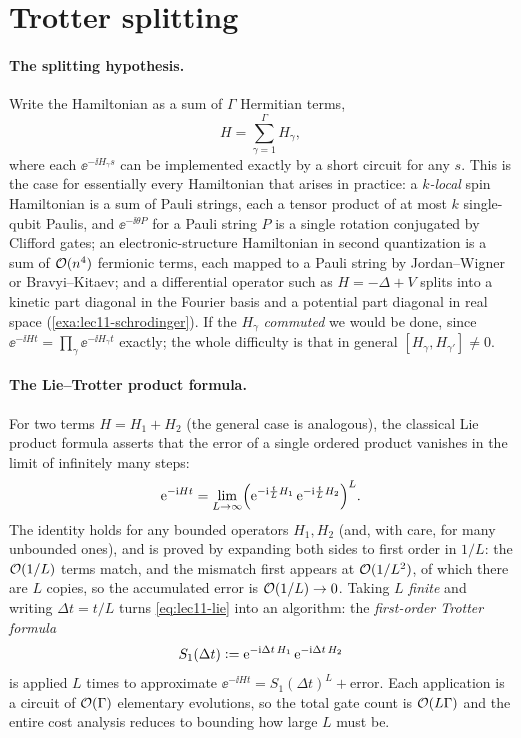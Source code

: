\section{Trotter splitting}
\label{sec:lec11-1}

\paragraph{The splitting hypothesis.}
Write the Hamiltonian as a sum of $\Gamma$ Hermitian terms,
\begin{equation}
  H=\sum_{\gamma=1}^{\Gamma}H_\gamma,
  \label{eq:lec11-split}
\end{equation}
where each $\ee^{-\ii H_\gamma s}$ can be implemented exactly by a short circuit for any
$s$. This is the case for essentially every Hamiltonian that arises in practice: a
\emph{$k$-local} spin Hamiltonian is a sum of Pauli strings, each a tensor product of at
most $k$ single-qubit Paulis, and $\ee^{-\ii\theta P}$ for a Pauli string $P$ is a single
rotation conjugated by Clifford gates; an electronic-structure Hamiltonian in second
quantization is a sum of $\mathcal{O}(n^4)$ fermionic terms, each mapped to a Pauli string by
Jordan--Wigner or Bravyi--Kitaev; and a differential operator such as
$H=-\Delta+V$ splits into a kinetic part diagonal in the Fourier basis and a potential
part diagonal in real space (\cref{exa:lec11-schrodinger}). If the $H_\gamma$
\emph{commuted} we would be done, since $\ee^{-\ii Ht}=\prod_\gamma\ee^{-\ii H_\gamma t}$
exactly; the whole difficulty is that in general $[H_\gamma,H_{\gamma'}]\neq0$.

\paragraph{The Lie--Trotter product formula.}
For two terms $H=H_1+H_2$ (the general case is analogous), the classical Lie product
formula asserts that the error of a single ordered product vanishes in the limit of
infinitely many steps:
\begin{equation}
  \mathrm{e}^{-\mathrm{i} H t}=\lim_{L\to\infty}\Bigl(\mathrm{e}^{-\mathrm{i}\frac{t}{L}H_1}\,\mathrm{e}^{-\mathrm{i}\frac{t}{L}H_2}\Bigr)^{L}.
  \label{eq:lec11-lie}
\end{equation}
The identity holds for any bounded operators $H_1,H_2$ (and, with care, for many
unbounded ones), and is proved by expanding both sides to first order in $1/L$: the
$\mathcal{O}(1/L)$ terms match, and the mismatch first appears at $\mathcal{O}(1/L^2)$, of which there
are $L$ copies, so the accumulated error is $\mathcal{O}(1/L)\to0$. Taking $L$ \emph{finite} and
writing $\Delta t=t/L$ turns \eqref{eq:lec11-lie} into an algorithm: the
\emph{first-order Trotter formula}
\begin{equation}
  S_1(\Delta t)\vcentcolon=\mathrm{e}^{-\mathrm{i}\Delta t\,H_1}\,\mathrm{e}^{-\mathrm{i}\Delta t\,H_2}
  \label{eq:lec11-S1}
\end{equation}
is applied $L$ times to approximate $\ee^{-\ii Ht}=S_1(\Delta t)^L+\text{error}$. Each
application is a circuit of $\mathcal{O}(\Gamma)$ elementary evolutions, so the total gate count
is $\mathcal{O}(L\Gamma)$ and the entire cost analysis reduces to bounding how large $L$ must be.

